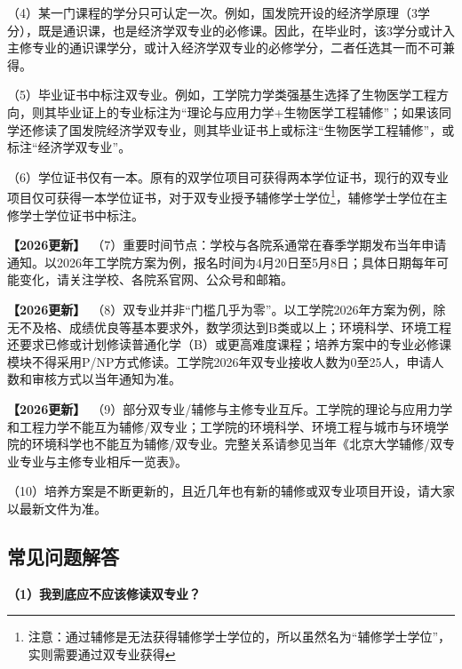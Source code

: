\documentclass[11pt,oneside]{book}
\newcommand{\updateMark}{\textcolor{chaph}{\textbf{【2026更新】}}\ }
\begin{document}
\vspace{10pt}

（4）某一门课程的学分只可认定一次。例如，国发院开设的经济学原理（3学分），既是通识课，也是经济学双专业的必修课。因此，在毕业时，该3学分或计入主修专业的通识课学分，或计入经济学双专业的必修学分，二者任选其一而不可兼得。

\vspace{10pt}

（5）毕业证书中标注双专业。例如，工学院力学类强基生选择了生物医学工程方向，则其毕业证上的专业标注为“理论与应用力学+生物医学工程辅修”；如果该同学还修读了国发院经济学双专业，则其毕业证书上或标注“生物医学工程辅修”，或标注“经济学双专业”。

\vspace{10pt}

（6）学位证书仅有一本。原有的双学位项目可获得两本学位证书，现行的双专业项目仅可获得一本学位证书，对于双专业授予辅修学士学位\footnote{注意：通过辅修是无法获得辅修学士学位的，所以虽然名为“辅修学士学位”，实则需要通过双专业获得}，辅修学士学位在主修学士学位证书中标注。

\vspace{10pt}

\updateMark（7）重要时间节点：学校与各院系通常在春季学期发布当年申请通知。以2026年工学院方案为例，报名时间为4月20日至5月8日；具体日期每年可能变化，请关注学校、各院系官网、公众号和邮箱。

\vspace{10pt}

\updateMark（8）双专业并非“门槛几乎为零”。以工学院2026年方案为例，除无不及格、成绩优良等基本要求外，数学须达到B类或以上；环境科学、环境工程还要求已修或计划修读普通化学（B）或更高难度课程；培养方案中的专业必修课模块不得采用P/NP方式修读。工学院2026年双专业接收人数为0至25人，申请人数和审核方式以当年通知为准。

\vspace{10pt}

\updateMark（9）部分双专业/辅修与主修专业互斥。工学院的理论与应用力学和工程力学不能互为辅修/双专业；工学院的环境科学、环境工程与城市与环境学院的环境科学也不能互为辅修/双专业。完整关系请参见当年《北京大学辅修/双专业专业与主修专业相斥一览表》。

\vspace{10pt}

（10）培养方案是不断更新的，且近几年也有新的辅修或双专业项目开设，请大家以最新文件为准。

\subsection{常见问题解答}
\textbf{（1）我到底应不应该修读双专业？}
\end{document}

